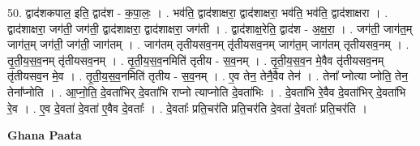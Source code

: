 \documentclass[17pt]{extarticle}
\begin{document}
50. द्वाद॑शकपाल॒ इति॒ द्वाद॑श - क॒पा॒लः॒ । . भव॑ति॒ द्वाद॑शाक्षरा॒ द्वाद॑शाक्षरा॒ भव॑ति॒ भव॑ति॒ द्वाद॑शाक्षरा । . द्वाद॑शाक्षरा॒ जग॑ती॒ जग॑ती॒ द्वाद॑शाक्षरा॒ द्वाद॑शाक्षरा॒ जग॑ती । . द्वाद॑शाक्ष॒रेति॒ द्वाद॑श - अ॒क्ष॒रा॒ । . जग॑ती॒ जाग॑त॒म् जाग॑त॒म् जग॑ती॒ जग॑ती॒ जाग॑तम् । . जाग॑तम् तृतीयसव॒नम् तृ॑तीयसव॒नम् जाग॑त॒म् जाग॑तम् तृतीयसव॒नम् । . तृ॒ती॒य॒स॒व॒नम् तृ॑तीयसव॒नम् । . तृ॒ती॒य॒स॒व॒नमिति॑ तृतीय - स॒व॒नम् । . तृ॒ती॒य॒स॒व॒न मे॒वैव तृ॑तीयसव॒नम् तृ॑तीयसव॒न मे॒व । . तृ॒ती॒य॒स॒व॒नमिति॑ तृतीय - स॒व॒नम् । . ए॒व तेन॒ तेनै॒वैव तेन॑ । . तेना᳚ प्नोत्या प्नोति॒ तेन॒ तेना᳚प्नोति । . आ॒प्नो॒ति॒ दे॒वता॑भिर् दे॒वता॑भि राप्नो त्याप्नोति दे॒वता॑भिः । . दे॒वता॑भि रे॒वैव दे॒वता॑भिर् दे॒वता॑भि रे॒व । . ए॒व दे॒वता॑ दे॒वता॑ ए॒वैव दे॒वताः᳚ । . दे॒वताः᳚ प्रति॒चर॑ति प्रति॒चर॑ति दे॒वता॑ दे॒वताः᳚ प्रति॒चर॑ति । \newline

\textbf{Ghana Paata } \newline
\end{document}
